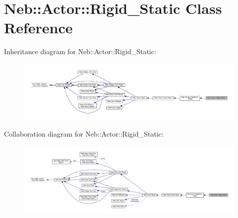 \hypertarget{classNeb_1_1Actor_1_1Rigid__Static}{\section{Neb\-:\-:Actor\-:\-:Rigid\-\_\-\-Static Class Reference}
\label{classNeb_1_1Actor_1_1Rigid__Static}
}


Inheritance diagram for Neb\-:\-:Actor\-:\-:Rigid\-\_\-\-Static\-:
\nopagebreak
\begin{figure}[H]
\begin{center}
\leavevmode
\includegraphics[width=350pt]{classNeb_1_1Actor_1_1Rigid__Static__inherit__graph}
\end{center}
\end{figure}


Collaboration diagram for Neb\-:\-:Actor\-:\-:Rigid\-\_\-\-Static\-:
\nopagebreak
\begin{figure}[H]
\begin{center}
\leavevmode
\includegraphics[width=350pt]{classNeb_1_1Actor_1_1Rigid__Static__coll__graph}
\end{center}
\end{figure}
